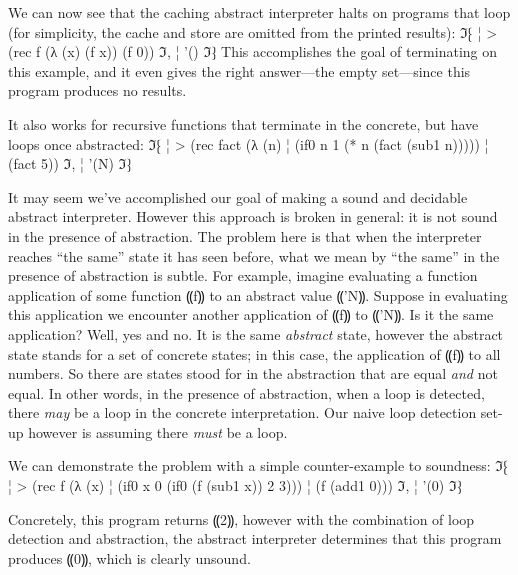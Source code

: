 We can now see that the caching abstract interpreter halts on programs that
loop (for simplicity, the cache and store are omitted from the printed
results):
ℑ⁅
¦ > (rec f (λ (x) (f x)) (f 0))
ℑ,
¦ '()
ℑ⁆
This accomplishes the goal of terminating on this example, and it even
gives the right answer---the empty set---since this program produces
no results.

It also works for recursive functions that terminate in the concrete,
but have loops once abstracted:
ℑ⁅
¦ > (rec fact (λ (n)
¦              (if0 n 1 (* n (fact (sub1 n)))))
¦     (fact 5))
ℑ,
¦ '(N)
ℑ⁆

It may seem we've accomplished our goal of making a sound and
decidable abstract interpreter.  However this approach is broken in
general: it is not sound in the presence of abstraction.  The problem
here is that when the interpreter reaches ``the same'' state it has
seen before, what we mean by ``the same'' in the presence of
abstraction is subtle.  For example, imagine evaluating a function
application of some function ⸨f⸩ to an abstract value
⸨'N⸩.  Suppose in evaluating this application we encounter
another application of ⸨f⸩ to ⸨'N⸩.  Is it the same
application?  Well, yes and no.  It is the same \emph{abstract} state,
however the abstract state stands for a set of concrete states; in
this case, the application of ⸨f⸩ to all numbers.  So there are
states stood for in the abstraction that are equal \emph{and} not
equal.  In other words, in the presence of abstraction, when a loop is
detected, there \emph{may} be a loop in the concrete interpretation.
Our naive loop detection set-up however is assuming there \emph{must}
be a loop.

We can demonstrate the problem with a simple counter-example to
soundness:
ℑ⁅
¦ > (rec f (λ (x) 
¦            (if0 x 0 (if0 (f (sub1 x)) 2 3)))
¦      (f (add1 0)))
ℑ,
¦ '(0)
ℑ⁆

Concretely, this program returns ⸨2⸩, however with the
combination of loop detection and abstraction, the abstract
interpreter determines that this program produces ⸨0⸩, which is
clearly unsound.
